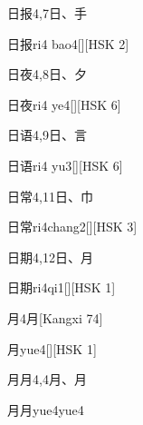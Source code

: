 \begin{Entry}{日报}{4,7}{⽇、⼿}
  \begin{Phonetics}{日报}{ri4 bao4}[][HSK 2]
  \end{Phonetics}
\end{Entry}

\begin{Entry}{日夜}{4,8}{⽇、⼣}
  \begin{Phonetics}{日夜}{ri4 ye4}[][HSK 6]
  \end{Phonetics}
\end{Entry}

\begin{Entry}{日语}{4,9}{⽇、⾔}
  \begin{Phonetics}{日语}{ri4 yu3}[][HSK 6]
  \end{Phonetics}
\end{Entry}

\begin{Entry}{日常}{4,11}{⽇、⼱}
  \begin{Phonetics}{日常}{ri4chang2}[][HSK 3]
  \end{Phonetics}
\end{Entry}

\begin{Entry}{日期}{4,12}{⽇、⽉}
  \begin{Phonetics}{日期}{ri4qi1}[][HSK 1]
  \end{Phonetics}
\end{Entry}

\begin{Entry}{月}{4}{⽉}[Kangxi 74]
  \begin{Phonetics}{月}{yue4}[][HSK 1]
  \end{Phonetics}
\end{Entry}

\begin{Entry}{月月}{4,4}{⽉、⽉}
  \begin{Phonetics}{月月}{yue4yue4}
  \end{Phonetics}
\end{Entry}

